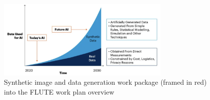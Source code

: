 \documentclass[a4paper,12pt]{article}
\begin{document}
\begin{figure}[htb]
    \centering
    \includegraphics[width=0.75\textwidth]{pics/gartner.png}
    \caption{Synthetic image and data generation work package (framed in red) into the FLUTE work plan overview}
    \label{fig:gartner}
\end{figure}

\newpage



\end{document}
